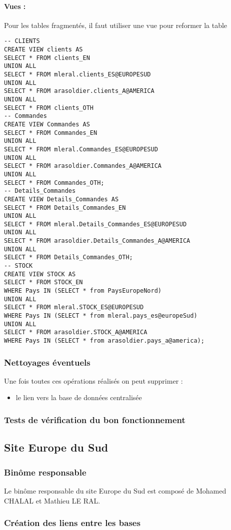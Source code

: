 \documentclass[10pt,a4paper,twoside]{article}
\begin{document}
\paragraph{Vues : } Pour les tables fragmentés, il faut utiliser une vue pour reformer la table
\begin{verbatim}
-- CLIENTS
CREATE VIEW clients AS 
SELECT * FROM clients_EN
UNION ALL
SELECT * FROM mleral.clients_ES@EUROPESUD
UNION ALL
SELECT * FROM arasoldier.clients_A@AMERICA
UNION ALL
SELECT * FROM clients_OTH
-- Commandes
CREATE VIEW Commandes AS 
SELECT * FROM Commandes_EN
UNION ALL
SELECT * FROM mleral.Commandes_ES@EUROPESUD
UNION ALL
SELECT * FROM arasoldier.Commandes_A@AMERICA
UNION ALL
SELECT * FROM Commandes_OTH;
-- Details_Commandes
CREATE VIEW Details_Commandes AS 
SELECT * FROM Details_Commandes_EN
UNION ALL
SELECT * FROM mleral.Details_Commandes_ES@EUROPESUD
UNION ALL
SELECT * FROM arasoldier.Details_Commandes_A@AMERICA
UNION ALL
SELECT * FROM Details_Commandes_OTH;
-- STOCK
CREATE VIEW STOCK AS 
SELECT * FROM STOCK_EN
WHERE Pays IN (SELECT * from PaysEuropeNord)
UNION ALL
SELECT * FROM mleral.STOCK_ES@EUROPESUD
WHERE Pays IN (SELECT * from mleral.pays_es@europeSud)
UNION ALL
SELECT * FROM arasoldier.STOCK_A@AMERICA
WHERE Pays IN (SELECT * from arasoldier.pays_a@america);
\end{verbatim}
\subsubsection{Nettoyages éventuels}
Une fois toutes ces opérations réalisés on peut supprimer :
\begin{itemize}
\item le lien vers la base de données centralisée
\end{itemize}
\subsubsection{Tests de vérification du bon fonctionnement}

\subsection{Site Europe du Sud}
\subsubsection{Binôme responsable}
Le binôme responsable du site Europe du Sud est composé de Mohamed CHALAL et Mathieu LE RAL.
\subsubsection{Création des liens entre les bases}
\end{document}
